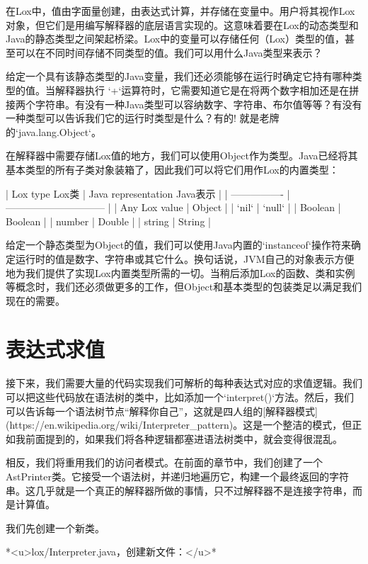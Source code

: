 \documentclass[cn,11pt,chinese]{elegantbook}
\begin{document}
在Lox中，值由字面量创建，由表达式计算，并存储在变量中。用户将其视作Lox对象，但它们是用编写解释器的底层语言实现的。这意味着要在Lox的动态类型和Java的静态类型之间架起桥梁。Lox中的变量可以存储任何（Lox）类型的值，甚至可以在不同时间存储不同类型的值。我们可以用什么Java类型来表示？

给定一个具有该静态类型的Java变量，我们还必须能够在运行时确定它持有哪种类型的值。当解释器执行 `+`运算符时，它需要知道它是在将两个数字相加还是在拼接两个字符串。有没有一种Java类型可以容纳数字、字符串、布尔值等等？有没有一种类型可以告诉我们它的运行时类型是什么？有的! 就是老牌的`java.lang.Object`。

在解释器中需要存储Lox值的地方，我们可以使用Object作为类型。Java已经将其基本类型的所有子类对象装箱了，因此我们可以将它们用作Lox的内置类型：

| Lox type   Lox类 | Java representation   Java表示 |
| ---------------- | ------------------------------ |
| Any Lox value    | Object                         |
| `nil`            | `null`                         |
| Boolean          | Boolean                        |
| number           | Double                         |
| string           | String                         |

给定一个静态类型为Object的值，我们可以使用Java内置的`instanceof`操作符来确定运行时的值是数字、字符串或其它什么。换句话说，JVM自己的对象表示方便地为我们提供了实现Lox内置类型所需的一切。当稍后添加Lox的函数、类和实例等概念时，我们还必须做更多的工作，但Object和基本类型的包装类足以满足我们现在的需要。

\section{表达式求值}

接下来，我们需要大量的代码实现我们可解析的每种表达式对应的求值逻辑。我们可以把这些代码放在语法树的类中，比如添加一个`interpret()`方法。然后，我们可以告诉每一个语法树节点“解释你自己”，这就是四人组的[解释器模式](https://en.wikipedia.org/wiki/Interpreter_pattern)。这是一个整洁的模式，但正如我前面提到的，如果我们将各种逻辑都塞进语法树类中，就会变得很混乱。

相反，我们将重用我们的访问者模式。在前面的章节中，我们创建了一个AstPrinter类。它接受一个语法树，并递归地遍历它，构建一个最终返回的字符串。这几乎就是一个真正的解释器所做的事情，只不过解释器不是连接字符串，而是计算值。

我们先创建一个新类。

*<u>lox/Interpreter.java，创建新文件：</u>*
\end{document}
